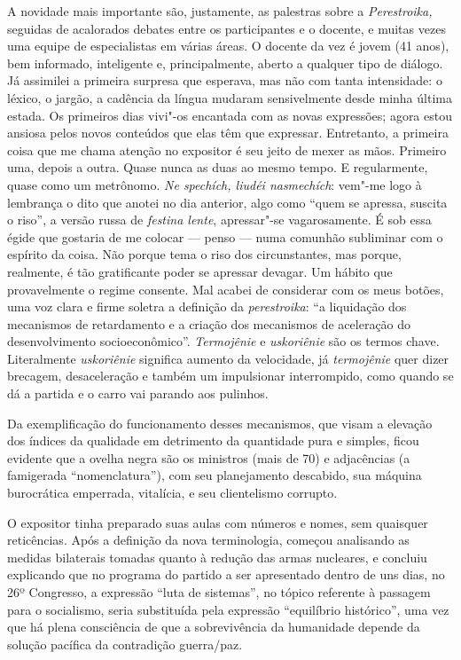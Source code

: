 A novidade mais importante são, justamente, as palestras sobre a
\emph{Perestroika,} seguidas de acalorados debates entre os
participantes e o docente, e muitas vezes uma equipe de especialistas em
várias áreas. O docente da vez é jovem (41 anos), bem informado,
inteligente e, principalmente, aberto a qualquer tipo de diálogo. Já
assimilei a primeira surpresa que esperava, mas não com tanta
intensidade: o léxico, o jargão, a cadência da língua mudaram
sensivelmente desde minha última estada. Os primeiros dias vivi"-os
encantada com as novas expressões; agora estou ansiosa pelos novos
conteúdos que elas têm que expressar. Entretanto, a primeira coisa que
me chama atenção no expositor é seu jeito de mexer as mãos. Primeiro
uma, depois a outra. Quase nunca as duas ao mesmo tempo. E regularmente,
quase como um metrônomo. \emph{Ne spechích, liudéi nasmechích}: vem"-me
logo à lembrança o dito que anotei no dia anterior, algo como ``quem se
apressa, suscita o riso'', a versão russa de \emph{festina lente},
apressar"-se vagarosamente. É sob essa égide que gostaria de me colocar
--- penso --- numa comunhão subliminar com o espírito da coisa. Não porque
tema o riso dos circunstantes, mas porque, realmente, é tão gratificante
poder se apressar devagar. Um hábito que provavelmente o regime
consente. Mal acabei de considerar com os meus botões, uma voz clara e
firme soletra a definição da \emph{perestroika}: ``a liquidação dos
mecanismos de retardamento e a criação dos mecanismos de aceleração do
desenvolvimento socioeconômico''. \emph{Termojênie} e \emph{uskoriênie}
são os termos chave. Literalmente \emph{uskoriênie} significa aumento da
velocidade, já \emph{termojênie} quer dizer brecagem, desaceleração e
também um impulsionar interrompido, como quando se dá a partida e o
carro vai parando aos pulinhos.

Da exemplificação do funcionamento desses mecanismos, que visam a
elevação dos índices da qualidade em detrimento da quantidade pura e
simples, ficou evidente que a ovelha negra são os ministros (mais de 70)
e adjacências (a famigerada ``nomenclatura''), com seu planejamento
descabido, sua máquina burocrática emperrada, vitalícia, e seu
clientelismo corrupto.

O expositor tinha preparado suas aulas com números e nomes, sem
quaisquer reticências. Após a definição da nova terminologia, começou
analisando as medidas bilaterais tomadas quanto à redução das armas
nucleares, e concluiu explicando que no programa do partido a ser
apresentado dentro de uns dias, no 26º Congresso, a expressão ``luta de
sistemas'', no tópico referente à passagem para o socialismo, seria
substituída pela expressão ``equilíbrio histórico'', uma vez que há
plena consciência de que a sobrevivência da humanidade depende da
solução pacífica da contradição guerra/paz.

